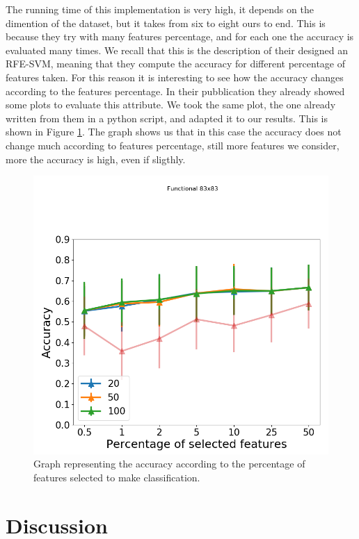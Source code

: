 The running time of this implementation is very high, it depends on the dimention of the dataset, but it takes from six to eight ours to end. This is because they try with many features percentage, and for each one the accuracy is evaluated many times. We recall that this is the description of their designed an RFE-SVM, meaning that they compute the accuracy for different percentage of features taken. For this reason it is interesting to see how the accuracy changes according to the features percentage. In their pubblication they already showed some plots to evaluate this attribute. We took the same plot, the one already written from them in a python script, and adapted it to our results. This is shown in Figure \ref{fig:diagram20}. The graph shows us that in this case the accuracy does not change much according to features percentage, still more features we consider, more the accuracy is high, even if sligthly. 

\begin{figure}[htbp]
	\centering
	\includegraphics[scale=0.5]{Immagini/fc_83_schizo.png}
	\caption{Graph representing the accuracy according to the percentage of features selected to make classification.}
	\label{fig:diagram20}
\end{figure}


\section{Discussion}

